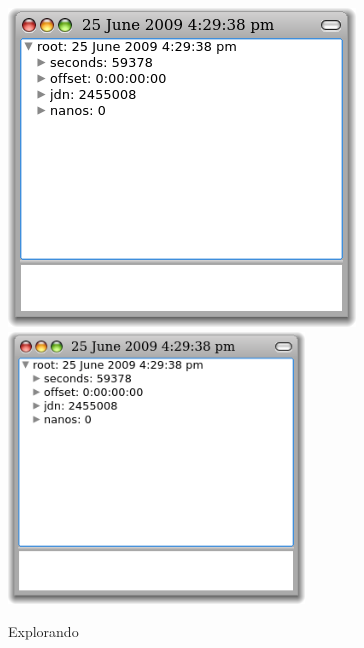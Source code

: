 \documentclass[spanish,a4paper,10pt,twoside]{book}
\begin{document}
\begin{figure}[tbp]
\begin{minipage}{0.48\textwidth}
	\begin{center}
	\ifluluelse
		{\includegraphics[width=\textwidth]{exploreTimeStampNow}}
		{\includegraphics[width=0.7\textwidth]{exploreTimeStampNow}}
	\end{center}
	\caption{Explorando }
\end{minipage}
\hfill
\begin{minipage}{0.48\textwidth}
	\begin{center}
	\ifluluelse

\end{center}
\end{minipage}
\end{figure}
\end{document}
